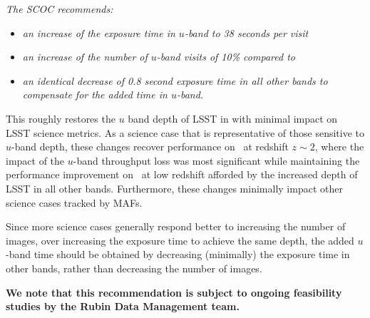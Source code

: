 \emph{The SCOC recommends:} 

\begin{itemize} 
\item \emph{an increase of the exposure time in $u$-band to 38 seconds per visit}
\item \emph{an increase of the number of $u$-band visits of 10\% compared to }
\item \emph{an identical decrease of 0.8 second exposure time in all other bands to compensate for the added time in $u$-band.} 
\end{itemize}


This roughly restores the $u$ band depth of LSST in  with minimal impact on LSST science metrics. As a science case that is representative of those sensitive to $u$-band depth, these changes recover performance on \pz\ at redshift $z\sim2$, where the impact of the $u$-band throughput loss was most significant while maintaining the performance improvement on \pz\ at low redshift afforded by the increased depth of LSST in all other bands. Furthermore, these changes minimally impact other science cases tracked by MAFs. 

Since more science cases generally respond better to increasing the number of images, over increasing the exposure time to achieve the same depth, the added $u$-band time should be obtained by decreasing (minimally) the exposure time in other bands, rather than decreasing the number of images.

\textbf{ We note that this recommendation is subject to ongoing feasibility studies by the Rubin Data 
Management team.}


